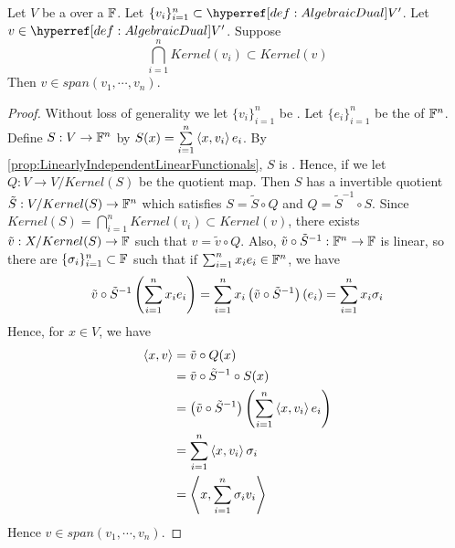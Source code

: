 \begin{prop}
\label{prop:FunctionalKernelIntersection}
Let $V$ be a \VectorSpace
over a \Field $\mathbb{F}$. 
Let $\{v_i\}_{i=1}^n \subset \scAlgebraicDual{V}$. 
Let $v \in \scAlgebraicDual{V}$. 
Suppose
\begin{equation*}
\bigcap\limits_{i=1}^n Kernel(v_i) \subset Kernel(v)
\end{equation*}
Then $v \in span(v_1, \cdots, v_n)$. 
\begin{proof}
   Without loss of generality 
    we let $\{v_i\}_{i=1}^n$ be \LinearlyIndependent.
    Let $\{e_i\}_{i=1}^n$ be the \StandardBasis of $\mathbb{F}^n$.
   Define $S:V \to \mathbb{F}^n$  by $S(x)=\sum\limits_{i=1}^n \left\langle x, v_i \right\rangle e_i$. 
   By \ref{prop:LinearlyIndependentLinearFunctionals}, $S$ is \Surjective.
   Hence, if we let $Q:V \to V/Kernel(S)$ be the quotient map. 
   Then $S$ has a invertible quotient 
   $\tilde{S}:V/Kernel(S) \to \mathbb{F}^n$ which satisfies
   $S=\tilde{S} \circ Q$ and $Q = \tilde{S}^{-1} \circ S$. 
   Since $Kernel(S) = \bigcap\limits_{i=1}^n Kernel(v_i) \subset Kernel(v)$, 
   there exists $\tilde{v}:X/Kernel(S) \to \mathbb{F}$ such that 
   $v=\tilde{v} \circ Q$. 
    Also, $\tilde{v}\circ \tilde{S}^{-1}:\mathbb{F}^n \to \mathbb{F}$
    is linear, so there are $\{\sigma_i\}_{i=1}^n \subset \mathbb{F}$ 
    such that if $\sum_{i=1}^n x_i e_i \in \mathbb{F}^n$, we have 
    \begin{equation*}
    \tilde{v} \circ \tilde{S}^{-1} \left( \sum\limits_{i=1}^n x_i e_i\right)
    = \sum\limits_{i=1}^n x_i \left( \tilde{v} \circ \tilde{S}^{-1}\right)(e_i)
    = \sum\limits_{i=1}^n x_i \sigma_i
    \end{equation*}
    Hence, for $x \in V$, we have 
    \begin{align*}
    \left\langle x, v \right\rangle & = \tilde{v} \circ Q (x) \\
    & = \tilde{v} \circ \tilde{S}^{-1} \circ S(x)\\
    & = \left( \tilde{v} \circ \tilde{S}^{-1}\right) \left(  \sum\limits_{i=1}^n \left\langle x, v_i \right\rangle e_i\right)\\
    & = \sum\limits_{i=1}^n \left\langle x, v_i \right\rangle \sigma_i\\
    & = \left\langle x, \sum\limits_{i=1}^n \sigma_i v_i \right\rangle
    \end{align*}
    Hence $v \in span(v_1, \cdots, v_n)$.
\end{proof}
\end{prop}
